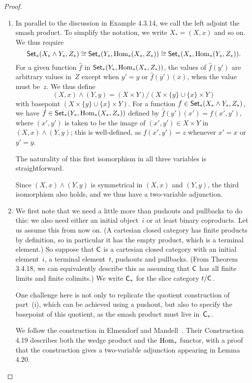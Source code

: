 \documentclass[../../solutions]{subfiles}
\begin{document}
\begin{proof}
  \begin{enumerate}[label=(\roman*)]
  \item In parallel to the discussion in Example 4.3.14, we call the
    left adjoint the smash product.  To simplify the notation, we
    write $X_*=(X,x)$ and so on.  We thus require
    $$\mathsf{Set}_*(X_*\wedge Y_*,Z_*) \cong \mathsf{Set}_*(Y_*, \operatorname{Hom}_*(X_*,Z_*)) \cong
    \mathsf{Set}_*(X_*, \operatorname{Hom}_*(Y_*,Z_*)).$$
    For a given function $\hat{f}$ in $\mathsf{Set}_*(Y_*, \operatorname{Hom}_*(X_*,Z_*))$,
    the values of $\hat{f}(y')$ are arbitrary values in~$Z$ except when
    $y'=y$ or $\hat{f}(y')(x)$, when the value must be~$z$.  We thus
    define
    $$(X,x)\wedge (Y,y) = (X\times Y)/(X\times\{y\}\cup \{x\}\times
    Y)$$
    with basepoint $(X\times\{y\}\cup \{x\}\times Y)$.  For a function
    $f\in\mathsf{Set}_*(X_*\wedge Y_*, Z_*)$, we have $\hat{f}\in \mathsf{Set}_*(Y_*,
    \operatorname{Hom}_*(X_*,Z_*))$ defined by $\hat{f}(y')(x') = f(x',y')$, where
    $(x',y')$ is taken to be the image of $(x',y')\in X\times Y$ in
    $(X,x)\wedge (Y,y)$; this is well-defined, as $f(x',y')=z$
    whenever $x'=x$ or $y'=y$.

    The naturality of this first isomorphism in all three variables is
    straightforward.

    Since $(X,x)\wedge(Y,y)$ is symmetrical in $(X,x)$ and $(Y,y)$,
    the third isomorphism also holds, and we thus have a two-variable
    adjunction.

  \item We first note that we need a little more than pushouts and
    pullbacks to do this: we also need either an initial object~$i$ or
    at least binary coproducts.  Let us assume this from now on.  (A
    cartesian closed category has finite products by definition, so in
    particular it has the empty product, which is a terminal element.)
    So suppose that ${\mathsf{C}}$ is a cartesian closed category with an
    initial element~$i$, a terminal element~$t$, pushouts and
    pullbacks.  (From Theorem 3.4.18, we can equivalently describe
    this as assuming that ${\mathsf{C}}$ has all finite limits and finite
    colimits.)  We write ${\mathsf{C}}_*$ for the slice category $t/{\mathsf{C}}$.

    One challenge here is not only to replicate the quotient
    construction of part~(i), which can be achieved using a pushout,
    but also to specify the basepoint of this quotient, as the smash
    product must live in~${\mathsf{C}}_*$.

    We follow the construction in Elmendorf and
    Mandell~\cite{elmendorf09}.  Their Construction 4.19 describes
    both the wedge product and the $\operatorname{Hom}_*$ functor, with a proof that
    the construction gives a two-variable adjunction appearing in
    Lemma 4.20.


\end{enumerate}
\end{proof}
\end{document}
